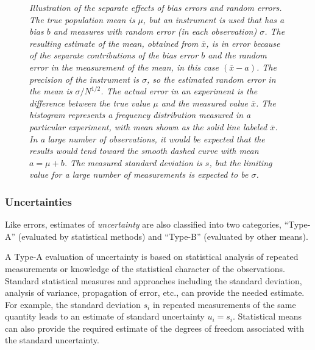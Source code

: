 \documentclass[12pt,twoside,english]{article}\usepackage[]{graphicx}\usepackage[]{color}
\let\OrgIndex\index
\renewcommand*{\index}[1]{\OrgIndex{#1}}
\begin{document}
{{\begin{appendices}
\begin{figure}[H]
\protect\caption[Illustration of the separate effects of bias errors and random errors.]{\emph{\label{fig:IllustrationOfTerms}Illustration of the separate effects of bias errors and random errors. The true population mean is $\mu$, but an instrument is used that has a bias $b$ and measures with random error (in each observation) $\sigma$. The resulting estimate of the mean, obtained from $\overline{x}$, is in error because of the separate contributions of the bias error $b$ and the random error in the measurement of the mean, in this case $(\overline{x}-a)$. The precision of the instrument is $\sigma$, so the estimated random error in the mean is $\sigma/{N}^{1/2}$. The actual error in an experiment is the difference between the true value $\mu$ and the measured value $\overline{x}$. The histogram represents a frequency distribution measured in a particular experiment, with mean shown as the solid line labeled $\overline{x}$. In a large number of observations, it would be expected that the results would tend toward the smooth dashed curve with mean $a=\mu+b$. The measured standard deviation is $s$, but the limiting value for a large number of measurements is expected to be $\sigma$.} } 


\end{figure}

\subsubsection{Uncertainties}

Like errors, estimates of \emph{uncertainty} are also classified into two categories, ``Type-A'' (evaluated by statistical methods) and ``Type-B'' (evaluated by other means). 


A Type-A evaluation of uncertainty is based on statistical analysis of repeated measurements or knowledge of the statistical character of the observations. Standard statistical measures and approaches including the standard deviation, analysis of variance, propagation of error, etc., can provide the needed estimate. For example, the standard deviation $s_{i}$ in repeated measurements of the same quantity leads to an estimate of standard uncertainty  $u_{i}=s_{i}$. Statistical means can also provide the required estimate of the degrees of freedom associated with the standard uncertainty. 


\end{appendices}}}
\end{document}
